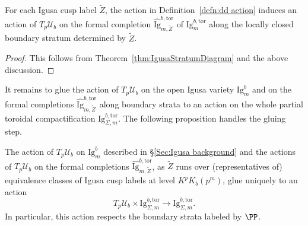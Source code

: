 \documentclass[letterpaper,11pt]{amsart}
\begin{document}
\begin{corollary}\label{cor: dd action boundary} For each Igusa cusp label $\widetilde{Z}$, the action in Definition~\ref{defn:dd action} induces an action of 
    $T_p\mathcal{U}_b$ on the formal completion $\widehat{\mathrm{Ig}}^{b,\mathrm{tor}}_{m,\widetilde{Z}}$ of $\mathrm{Ig}^{b,\mathrm{tor}}_{m}$ along the locally closed boundary stratum determined by $\widetilde{Z}$. 
\end{corollary}

\begin{proof} This follows from Theorem~\ref{thm:IgusaStratumDiagram} and the above discussion. 
\end{proof}

 It remains to glue the action of $T_p\mathcal{U}_b$ on the open Igusa variety $\mathrm{Ig}^b_m$ and on the formal completions $\widehat{\mathrm{Ig}}^{b,\mathrm{tor}}_{m, \widetilde{Z}}$ along boundary strata to an action on the whole partial toroidal compactification $\mathrm{Ig}^{b,\mathrm{tor}}_{\Sigma, m}$. The following proposition handles the gluing step.   

\begin{proposition}\label{prop:gluing action}
The action of $T_p\mathcal{U}_b$ on $\mathrm{Ig}^b_m$ described in \S\ref{Sec:Igusa background} and the actions of $T_p\mathcal{U}_b$ on the formal completions $\widehat{\mathrm{Ig}}^{b,\mathrm{tor}}_{m, \widetilde{Z}}$, as $\widetilde{Z}$ runs over (representatives of) equivalence classes of Igusa cusp labels at level $K^pK_{b}(p^m)$, glue uniquely to an action 
\[
T_p\mathcal{U}_b \times \mathrm{Ig}^{b,\mathrm{tor}}_{\Sigma, m}\to \mathrm{Ig}^{b,\mathrm{tor}}_{\Sigma, m}. 
\]
In particular, this action respects the boundary strata labeled by $\PP$. 
\end{proposition}
\end{document}
